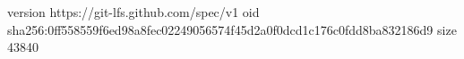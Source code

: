 version https://git-lfs.github.com/spec/v1
oid sha256:0ff558559f6ed98a8fec02249056574f45d2a0f0dcd1c176c0fdd8ba832186d9
size 43840
